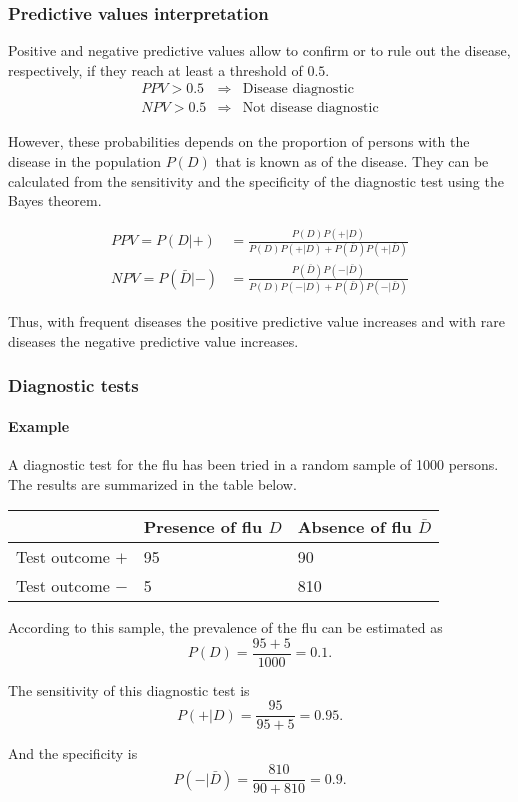 \begin{frame}
\frametitle{Predictive values interpretation}
Positive and negative predictive values allow to confirm or to rule out the disease, respectively, if they reach at
least a threshold of $0.5$.
\[
\begin{array}{rcl}
PPV>0.5 & \Rightarrow & \mbox{Disease diagnostic}\\
NPV>0.5 & \Rightarrow & \mbox{Not disease diagnostic} 
\end{array}
\]

However, these probabilities depends on the proportion of persons with the disease in the population $P(D)$ that is
known as  of the disease.
They can be calculated from the sensitivity and the specificity of the diagnostic test using the Bayes theorem.

\begin{align*}
PPV=P(D|+) &= \frac{P(D)P(+|D)}{P(D)P(+|D)+P(\bar D)P(+|\bar D)}\\
NPV=P(\bar D|-) &= \frac{P(\bar D)P(-|\bar D)}{P(D)P(-|D)+P(\bar D)P(-|\bar D)}
\end{align*} 

Thus, with frequent diseases the positive predictive value increases and with rare diseases the negative predictive
value increases. 
\end{frame}


\begin{frame}
\frametitle{Diagnostic tests}
\framesubtitle{Example}
A diagnostic test for the flu has been tried in a random sample of 1000 persons.
The results are summarized in the table below.
\begin{center}
\begin{tabular}{|m{2.5cm}|m{3cm}<{\centering}|m{3cm}<{\centering}|}
\cline{2-3}
\multicolumn{1}{c|}{} & Presence of flu $D$ & Absence of flu $\bar D$\\ \hline
Test outcome $+$ & 95 & 90 \\
\hline
Test outcome $-$ & 5 & 810 \\
\hline
\end{tabular}
\end{center}

According to this sample, the prevalence of the flu can be estimated as
\[
P(D) = \frac{95+5}{1000} = 0.1.
\] 

The sensitivity of this diagnostic test is
\[
P(+|D) = \frac{95}{95+5}= 0.95. 
\] 

And the specificity is 
\[
P(-|\bar D) = \frac{810}{90+810}=0.9.
\]
\end{frame}


